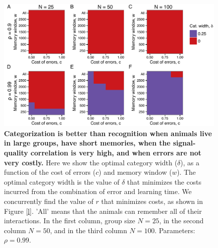 \begin{figure}
\includegraphics[width=6.85in]{figures/strategies_heat_maps.pdf}
\caption{\sffamily\small\textbf{Categorization is better than recognition when animals live in large groups, have short memories, when the signal-quality correlation is very high, and when errors are not very costly.} Here we show the optimal category width ($\delta$), as a function of the cost of errors ($c$) and memory window ($w$). The optimal category width is the value of $\delta$ that minimizes the costs incurred from the combination of error and learning time. We concurrently find the value of $r$ that minimizes costs, as shown in Figure \ref{l}. 'All' means that the animals can remember all of their interactions. In the first column, group size $N=25$, in the second column $N=50$, and in the third column $N=100$. Parameters: $\rho=0.99$. }
\label{opt_delta}
\end{figure}


